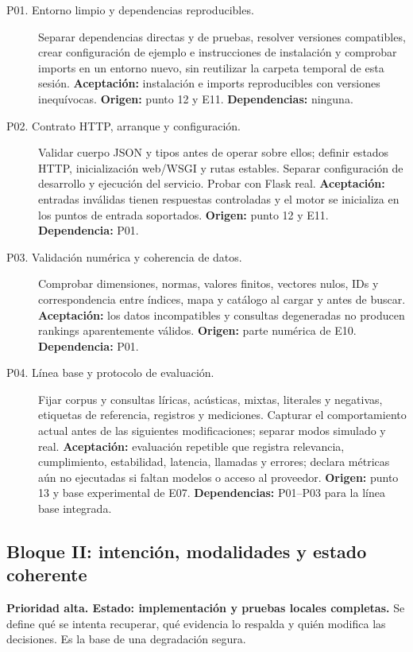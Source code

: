 \begin{description}
\item[P01. Entorno limpio y dependencias reproducibles.]
Separar dependencias directas y de pruebas, resolver versiones compatibles,
crear configuración de ejemplo e instrucciones de instalación y comprobar
imports en un entorno nuevo, sin reutilizar la carpeta temporal de esta sesión.
\textbf{Aceptación:} instalación e imports reproducibles con versiones
inequívocas. \textbf{Origen:} punto 12 y E11. \textbf{Dependencias:} ninguna.

\item[P02. Contrato HTTP, arranque y configuración.]
Validar cuerpo JSON y tipos antes de operar sobre ellos; definir estados HTTP,
inicialización web/WSGI y rutas estables. Separar configuración de desarrollo
y ejecución del servicio. Probar con Flask real.
\textbf{Aceptación:} entradas inválidas tienen respuestas controladas y el motor
se inicializa en los puntos de entrada soportados.
\textbf{Origen:} punto 12 y E11. \textbf{Dependencia:} P01.

\item[P03. Validación numérica y coherencia de datos.]
Comprobar dimensiones, normas, valores finitos, vectores nulos, IDs y
correspondencia entre índices, mapa y catálogo al cargar y antes de buscar.
\textbf{Aceptación:} los datos incompatibles y consultas degeneradas no producen
rankings aparentemente válidos. \textbf{Origen:} parte numérica de E10.
\textbf{Dependencia:} P01.

\item[P04. Línea base y protocolo de evaluación.]
Fijar corpus y consultas líricas, acústicas, mixtas, literales y negativas,
etiquetas de referencia, registros y mediciones. Capturar el comportamiento
actual antes de las siguientes modificaciones; separar modos simulado y real.
\textbf{Aceptación:} evaluación repetible que registra relevancia, cumplimiento,
estabilidad, latencia, llamadas y errores; declara métricas aún no ejecutadas
si faltan modelos o acceso al proveedor.
\textbf{Origen:} punto 13 y base experimental de E07.
\textbf{Dependencias:} P01--P03 para la línea base integrada.
\end{description}

\subsection{Bloque II: intención, modalidades y estado coherente}
\textbf{Prioridad alta. Estado: implementación y pruebas locales completas.} Se define qué se intenta recuperar, qué evidencia lo
respalda y quién modifica las decisiones. Es la base de una degradación segura.

